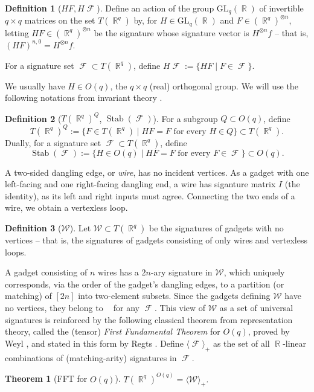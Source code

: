 \documentclass{article}
\newtheorem{theorem}{Theorem}[section]
\theoremstyle{remark}
\theoremstyle{definition}
\newtheorem{definition}{Definition}[section]
\DeclareMathOperator{\rr}{\mathbb{R}}
\DeclareMathOperator{\fc}{\mathcal{F}}
\DeclareMathOperator{\gk}{\mathfrak{G}_{\mathcal{F}}}
\DeclareMathOperator{\stab}{Stab}
\begin{document}
\begin{definition}[$HF,H\fc$]
    Define an action of the group $\text{GL}_q(\rr)$ of invertible $q \times q$ matrices on the set 
    $T(\rr^q)$ by, for $H \in \text{GL}_q(\rr)$ and 
    $F \in (\rr^q)^{\otimes n}$, letting $HF\in (\rr^q)^{\otimes n}$ be the signature whose signature vector is
    $H^{\otimes n}f$ -- that is, $(HF)^{n,0} = H^{\otimes n}f$.

    For a signature set $\fc \subset T(\rr^q)$, define $H\fc := \{HF \mid F \in \fc\}$.
\end{definition}
We usually have $H \in O(q)$, the $q \times q$ (real) orthogonal group. We will use the following
notations from invariant theory \cite{schrijver_tensor_2008, regts_rank_2012}.
\begin{definition}[$T(\rr^q)^Q$, $\stab(\fc)$]
    \label{def:invariance}
    For a subgroup $Q \subset O(q)$, define
    \[
        T(\rr^q)^Q := \{F \in T(\rr^q) \mid HF = F \text{ for every } H \in Q\} \subset T(\rr^q).
    \]
    Dually, for a signature set $\fc \subset T(\rr^q)$, define
    \[
        \stab(\fc) := \{H \in O(q) \mid HF = F \text{ for every } F \in \fc\} \subset O(q).
    \]
\end{definition}
A two-sided dangling edge, or \emph{wire}, has no incident vertices. As a gadget with one
left-facing and one right-facing dangling end, a wire
has siganture matrix $I$ (the identity), as its left and right inputs must agree.
Connecting the two ends of a wire, we obtain a vertexless loop.
\begin{definition}[$\mathcal{W}$]
    Let $\mathcal{W} \subset T(\rr^q)$ be the signatures of
    gadgets with no vertices -- that is, the signatures of gadgets consisting of only wires and 
    vertexless loops.
\end{definition}
A gadget consisting of $n$ wires has a $2n$-ary
signature in $\mathcal{W}$, which uniquely corresponds, via the order of the gadget's dangling edges,
to a partition (or matching) of $[2n]$ into two-element subsets.
Since the gadgets defining $\mathcal{W}$ have no vertices, they belong to $\gk$ for any $\fc$.
This view of $\mathcal{W}$ as a set of universal signatures is reinforced by the following
classical theorem from representation theory, called the (tensor) \emph{First Fundamental Theorem} for
$O(q)$, proved by Weyl \cite{weyl_classical_1966}, and stated in this
form by Regts \cite[Theorem 4.3]{regts}. 
Define $\langle \fc \rangle_+$ as the set of all $\rr$-linear 
combinations of (matching-arity) signatures in $\fc$.
\begin{theorem}[FFT for $O(q)$]
    $T(\rr^q)^{O(q)} = \langle \mathcal{W} \rangle_+$.
    \label{thm:fft}
\end{theorem}
\end{document}
